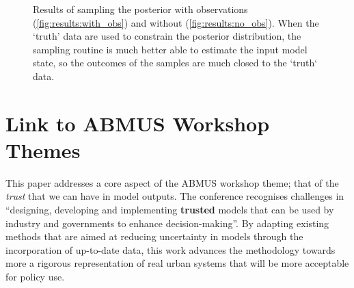 \documentclass[runningheads]{llncs}
\begin{document}
\begin{figure}%
\centering
{}
\caption{Results of sampling the posterior with observations (\ref{fig:results:with_obs}) and without (\ref{fig:results:no_obs}). When the `truth' data are used to constrain the posterior distribution, the sampling routine is much better able to estimate the input model state, so the outcomes of the samples are much closed to the `truth` data.} 
\label{fig:model_uncertainty}
\end{figure}


\section{Link to ABMUS Workshop Themes}

This paper addresses a core aspect of the ABMUS workshop theme; that of the \textit{trust} that we can have in model outputs. The conference recognises challenges in ``designing, developing and implementing \textbf{trusted} models that can be used by industry and governments to enhance decision-making''. By adapting existing methods that are aimed at reducing uncertainty in models through the incorporation of up-to-date data, this work advances the methodology towards more a rigorous representation of real urban systems that will be more acceptable for policy use.
\end{document}
